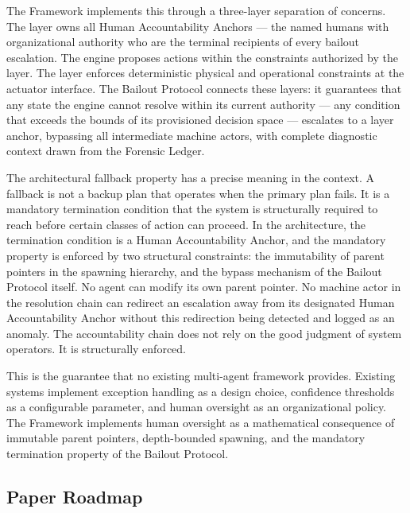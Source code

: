 The \bxthree Framework implements this through a three-layer separation of concerns. The \purpose layer owns all Human Accountability Anchors — the named humans with organizational authority who are the terminal recipients of every bailout escalation. The \bounds engine proposes actions within the constraints authorized by the \purpose layer. The \fact layer enforces deterministic physical and operational constraints at the actuator interface. The Bailout Protocol connects these layers: it guarantees that any state the \bounds engine cannot resolve within its current authority — any condition that exceeds the bounds of its provisioned decision space — escalates to a \purpose layer anchor, bypassing all intermediate machine actors, with complete diagnostic context drawn from the Forensic Ledger.

The architectural fallback property has a precise meaning in the \bxthree context. A fallback is not a backup plan that operates when the primary plan fails. It is a mandatory termination condition that the system is structurally required to reach before certain classes of action can proceed. In the \bxthree architecture, the termination condition is a Human Accountability Anchor, and the mandatory property is enforced by two structural constraints: the immutability of parent pointers in the spawning hierarchy, and the bypass mechanism of the Bailout Protocol itself. No agent can modify its own parent pointer. No machine actor in the resolution chain can redirect an escalation away from its designated Human Accountability Anchor without this redirection being detected and logged as an anomaly. The accountability chain does not rely on the good judgment of system operators. It is structurally enforced.

This is the guarantee that no existing multi-agent framework provides. Existing systems implement exception handling as a design choice, confidence thresholds as a configurable parameter, and human oversight as an organizational policy. The \bxthree Framework implements human oversight as a mathematical consequence of immutable parent pointers, depth-bounded spawning, and the mandatory termination property of the Bailout Protocol.

\subsection{Paper Roadmap}

